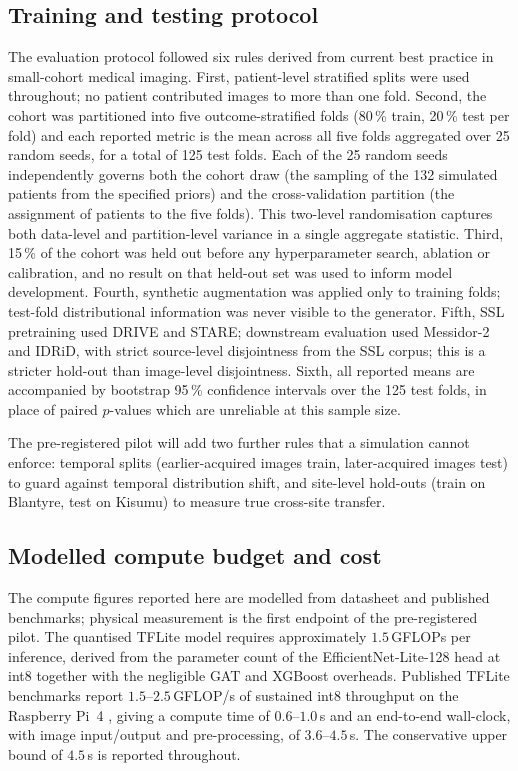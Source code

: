 \documentclass[twocolumn,10pt]{article}
\begin{document}
\subsection{Training and testing protocol}
\label{sec:protocol}
The evaluation protocol followed six rules derived from current
best practice in small-cohort medical imaging. First,
patient-level stratified splits were used throughout; no patient
contributed images to more than one fold. Second, the cohort was
partitioned into five outcome-stratified folds
(80\,\% train, 20\,\% test per fold) and each reported metric is
the mean across all five folds aggregated over 25 random seeds,
for a total of 125 test folds. Each of the 25 random seeds
independently governs both the cohort draw (the sampling of the
132 simulated patients from the specified priors) and the
cross-validation partition (the assignment of patients to the five
folds). This two-level randomisation captures both data-level and
partition-level variance in a single aggregate statistic.
Third, 15\,\% of the cohort was held out before any hyperparameter
search, ablation or calibration, and no result on that held-out
set was used to inform model development. Fourth, synthetic
augmentation was applied only to training folds; test-fold
distributional information was never visible to the generator.
Fifth, SSL pretraining used DRIVE and STARE; downstream evaluation
used Messidor-2 and IDRiD, with strict source-level disjointness
from the SSL corpus; this is a stricter hold-out than image-level
disjointness. Sixth, all reported means are accompanied by
bootstrap 95\,\% confidence intervals over the 125 test folds, in
place of paired $p$-values which are unreliable at this sample
size.

The pre-registered pilot will add two further rules that a
simulation cannot enforce: temporal splits
(earlier-acquired images train, later-acquired images test) to
guard against temporal distribution shift, and site-level
hold-outs (train on Blantyre, test on Kisumu) to measure true
cross-site transfer.

\subsection{Modelled compute budget and cost}
\label{sec:compute}
The compute figures reported here are modelled from datasheet and
published benchmarks; physical measurement is the first endpoint
of the pre-registered pilot. The quantised TFLite model requires
approximately $1.5$\,GFLOPs per inference, derived from the
parameter count of the EfficientNet-Lite-128 head at int8
together with the negligible GAT and XGBoost overheads. Published
TFLite benchmarks report $1.5$--$2.5$\,GFLOP/s of sustained int8
throughput on the Raspberry Pi~4
\cite{RaspberryPi2022,TFLite2022,RaspberryPiPower2021}, giving a
compute time of $0.6$--$1.0$\,s and an end-to-end wall-clock,
with image input/output and pre-processing, of
$3.6$--$4.5$\,s. The conservative upper bound of $4.5$\,s is
reported throughout.
\end{document}
